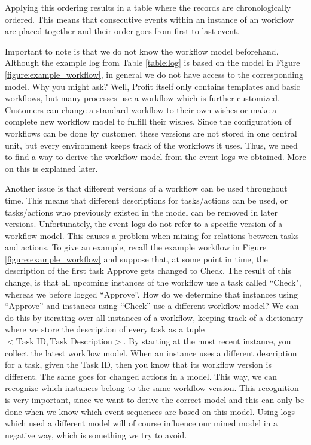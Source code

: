 \documentclass[a4paper,11pt]{article}
\begin{document}
Applying this ordering results in a table where the records are chronologically ordered. This means that consecutive events within an instance of an workflow are placed together and their order goes from first to last event. 

Important to note is that we do not know the workflow model beforehand. Although the example log from Table \ref{table:log} is based on the model in Figure \ref{figure:example_workflow}, in general we do not have access to the corresponding model. Why you might ask? Well, Profit itself only contains templates and basic workflows, but many processes use a workflow which is further customized. Customers can change a standard workflow to their own wishes or make a complete new workflow model to fulfill their wishes. Since the configuration of workflows can be done by customer, these versions are not stored in one central unit, but every environment keeps track of the workflows it uses. Thus, we need to find a way to derive the workflow model from the event logs we obtained. More on this is explained later.

Another issue is that different versions of a workflow can be used throughout time. This means that different descriptions for tasks/actions can be used, or tasks/actions who previously existed in the model can be removed in later versions. Unfortunately, the event logs do not refer to a specific version of a workflow model. This causes a problem when mining for relations between tasks and actions. To give an example, recall the example workflow in Figure \ref{figure:example_workflow} and suppose that, at some point in time, the description of the first task Approve gets changed to Check. The result of this change, is that all upcoming instances of the workflow use a task called ``Check", whereas we before logged ``Approve''. How do we determine that instances using ``Approve'' and instances using ``Check'' use a different workflow model? We can do this by iterating over all instances of a workflow, keeping track of a dictionary where we store the description of every task as a tuple $<\text{Task ID}, \text{Task Description}>$. By starting at the most recent instance, you collect the latest workflow model. When an instance uses a different description for a task, given the Task ID, then you know that its workflow version is different. The same goes for changed actions in a model. This way, we can recognize which instances belong to the same workflow version. This recognition is very important, since we want to derive the correct model and this can only be done when we know which event sequences are based on this model. Using logs which used a different model will of course influence our mined model in a negative way, which is something we try to avoid.
\end{document}
